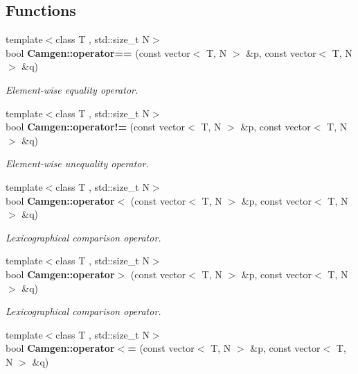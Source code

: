 \subsection*{Functions}
\begin{DoxyCompactItemize}
\item 
\hypertarget{a00849_ad87091437897510fb5b3148e2c025c13}{{\footnotesize template$<$class T , std\-::size\-\_\-t N$>$ }\\bool {\bfseries Camgen\-::operator==} (const vector$<$ T, N $>$ \&p, const vector$<$ T, N $>$ \&q)}\label{a00849_ad87091437897510fb5b3148e2c025c13}

\begin{DoxyCompactList}\small\item\em Element-\/wise equality operator. \end{DoxyCompactList}\item 
\hypertarget{a00849_af8ee7e609bab4684280db1256dde6cb7}{{\footnotesize template$<$class T , std\-::size\-\_\-t N$>$ }\\bool {\bfseries Camgen\-::operator!=} (const vector$<$ T, N $>$ \&p, const vector$<$ T, N $>$ \&q)}\label{a00849_af8ee7e609bab4684280db1256dde6cb7}

\begin{DoxyCompactList}\small\item\em Element-\/wise unequality operator. \end{DoxyCompactList}\item 
\hypertarget{a00849_afe05a43f050787e6718ca5e9107281b0}{{\footnotesize template$<$class T , std\-::size\-\_\-t N$>$ }\\bool {\bfseries Camgen\-::operator$<$} (const vector$<$ T, N $>$ \&p, const vector$<$ T, N $>$ \&q)}\label{a00849_afe05a43f050787e6718ca5e9107281b0}

\begin{DoxyCompactList}\small\item\em Lexicographical comparison operator. \end{DoxyCompactList}\item 
\hypertarget{a00849_a1b01a740e824187a9c3229c98f2be187}{{\footnotesize template$<$class T , std\-::size\-\_\-t N$>$ }\\bool {\bfseries Camgen\-::operator$>$} (const vector$<$ T, N $>$ \&p, const vector$<$ T, N $>$ \&q)}\label{a00849_a1b01a740e824187a9c3229c98f2be187}

\begin{DoxyCompactList}\small\item\em Lexicographical comparison operator. \end{DoxyCompactList}\item 
\hypertarget{a00849_a280d481a0fca42913f50d9875f7fb3f5}{{\footnotesize template$<$class T , std\-::size\-\_\-t N$>$ }\\bool {\bfseries Camgen\-::operator$<$=} (const vector$<$ T, N $>$ \&p, const vector$<$ T, N $>$ \&q)}\label{a00849_a280d481a0fca42913f50d9875f7fb3f5}


\end{DoxyCompactItemize}
